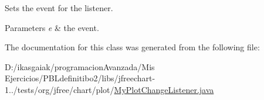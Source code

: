 Sets the event for the listener.


\begin{DoxyParams}{Parameters}
{\em e} & the event. \\
\hline
\end{DoxyParams}


The documentation for this class was generated from the following file\+:\begin{DoxyCompactItemize}
\item 
D\+:/ikasgaiak/programacion\+Avanzada/\+Mis Ejercicios/\+P\+B\+Ldefinitibo2/libs/jfreechart-\/1../tests/org/jfree/chart/plot/\mbox{\hyperlink{_my_plot_change_listener_8java}{My\+Plot\+Change\+Listener.\+java}}\end{DoxyCompactItemize}
